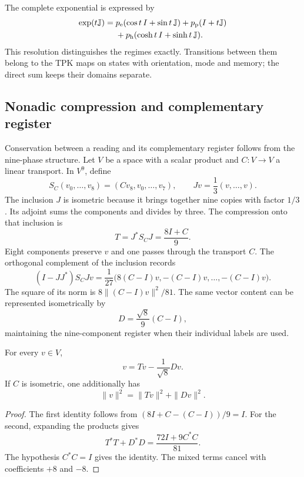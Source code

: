The complete exponential is expressed by
\begin{align}
 \exp(t\mathbb J)={}&p_{\mathrm e}(\cos t\,I+\sin t\,\mathbb J)
 +p_{\mathrm p}(I+t\mathbb J)\notag\\
 &+p_{\mathrm h}(\cosh t\,I+\sinh t\,\mathbb J).
\end{align}
This resolution distinguishes the regimes exactly. Transitions
between them belong to the TPK maps on states with orientation,
mode and memory; the direct sum keeps their domains separate.

\subsection{Nonadic compression and complementary register}
\label{eul:compresion}

Conservation between a reading and its complementary register follows
from the nine-phase structure. Let \(V\) be a space with a scalar
product and \(C:V\to V\) a linear transport. In \(V^9\), define
\[
 S_C(v_0,\ldots,v_8)=(Cv_8,v_0,\ldots,v_7),
 \qquad Jv=\frac13(v,\ldots,v).
\]
The inclusion \(J\) is isometric because it brings together nine copies with factor
\(1/3\). Its adjoint sums the components and divides by three. The
compression onto that inclusion is
\[
 T=J^*S_CJ=\frac{8I+C}{9}.
\]
Eight components preserve \(v\) and one passes through the transport \(C\).
The orthogonal complement of the inclusion records
\[
 (I-JJ^*)S_CJv
 =\frac1{27}\bigl(8(C-I)v,-(C-I)v,\ldots,-(C-I)v\bigr).
\]
The square of its norm is
\(8\|(C-I)v\|^2/81\). The same vector content can be represented
isometrically by
\[
 D=\frac{\sqrt8}{9}(C-I),
\]
maintaining the nine-component register when their
individual labels are used.

\begin{proposicion}
\label{eul:prop:recuperacion}
For every \(v\in V\),
\begin{equation}
 v=Tv-\frac1{\sqrt8}Dv.
\label{eul:eq:recuperacion}
\end{equation}
If \(C\) is isometric, one additionally has
\[
 \|v\|^2=\|Tv\|^2+\|Dv\|^2.
\]
\end{proposicion}
\begin{proof}
The first identity follows from
\((8I+C-(C-I))/9=I\). For the second, expanding the products
gives
\[
 T^*T+D^*D=\frac{72I+9C^*C}{81}.
\]
The hypothesis \(C^*C=I\) gives the identity. The mixed terms cancel with coefficients \(+8\) and \(-8\).
\end{proof}

